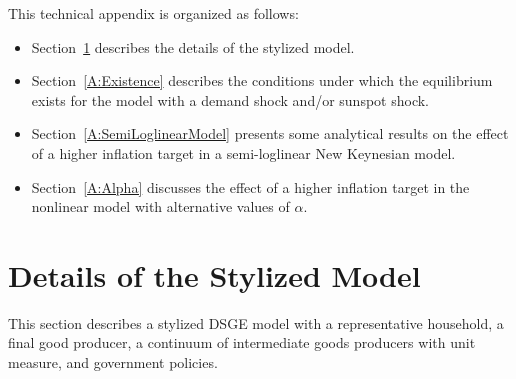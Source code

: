 \documentclass[11pt]{article}
\begin{document}
	\begin{singlespace}
		
		\vspace{2em}
		\noindent This technical appendix is organized as follows:
		\begin{itemize}
			\item Section~\ref{A:Details_Stylized} describes the details of the stylized model.
			\item Section~\ref{A:Existence} describes the conditions under which the equilibrium exists for the model with a demand shock and/or sunspot shock. 
			\item Section~\ref{A:SemiLoglinearModel} presents some analytical results on the effect of a higher inflation target in a semi-loglinear New Keynesian model.
			\item Section~\ref{A:Alpha} discusses the effect of a higher inflation target in the nonlinear model with alternative values of $\alpha$.
		\end{itemize}
		
		\section{Details of the Stylized Model}
		\label{A:Details_Stylized}
		
		\normalsize{This section describes a stylized DSGE model with a representative household, a final good producer, a continuum of intermediate goods producers with unit measure, and government policies.}
		

\end{singlespace}
\end{document}
